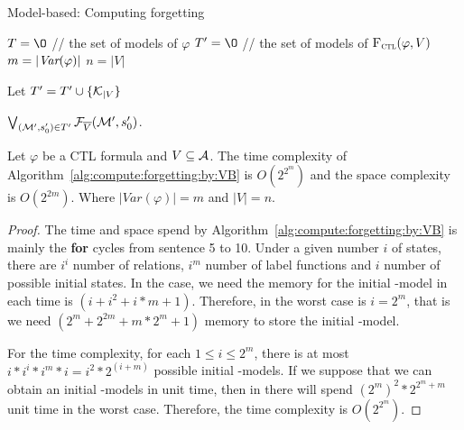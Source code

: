 \documentclass{article}
\begin{document}
\begin{algorithm}
\caption{Model-based: Computing forgetting}
\label{alg:compute:forgetting:by:VB}
$T={\O}$ // the set of models of $\varphi$ \;
$T' = {\O}$ // the set of models of ${\textsc{F}_{\textsc{ctl}}}(\varphi, V)$ \;
$m=|\textit{Var}(\varphi)|$\;
$n=|V|$\;

 {
    Let $T' = T' \cup \{{\cal K}_{|V} \}$\;
}

\Return $\bigvee_{({\cal M}', s_0')\in T'} {\cal F}_{\overline V}({\cal M}', s_0')$.
\end{algorithm}


\begin{proposition}
 Let $\varphi$ be a CTL formula and $V\subseteq {\cal A}$. The time complexity of
Algorithm~\ref{alg:compute:forgetting:by:VB} is $O(2^{2^m})$ and the space complexity is $O(2^{2m})$. Where $|Var(\varphi)| = m$ and $|V| = n$.
\end{proposition}
\begin{proof}
The time and space spend by Algorithm~\ref{alg:compute:forgetting:by:VB} is mainly the \textbf{for} cycles from sentence 5 to 10.
Under a given number $i$ of states, there are $i^i$ number of relations, $i^m$ number of label functions and $i$ number of possible initial states. In the case, we need the memory for the initial \MPK-model in each time is $(i+i^2+i*m+1)$.
Therefore, in the worst case is $i=2^m$, that is we need $(2^m + 2^{2m}+m*2^m+1)$ memory to store the initial \MPK-model.

For the time complexity, for each $1\leq i \leq 2^m$, there is at most $i*i^i*i^m*i=i^2*2^{(i+m)}$ possible initial \MPK-models.
If we suppose that we can obtain an initial \MPK-models in unit time, then in there will spend $(2^m)^2*2^{2^m+m}$ unit time in the worst case. Therefore, the time complexity is $O(2^{2^m})$.
\end{proof}
\end{document}
